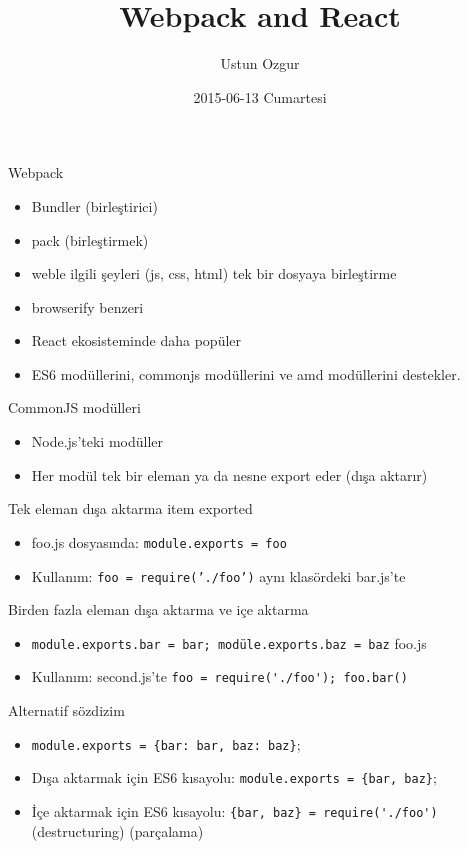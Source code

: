 \documentclass[presentation]{beamer}
\author{Ustun Ozgur}
\date{2015-06-13 Cumartesi}
\title{Webpack and React}
\begin{document}
\maketitle

\begin{frame}[label=sec-1]{Webpack}
\begin{itemize}
\item Bundler (birleştirici)
\item pack (birleştirmek)
\item weble ilgili şeyleri (js, css, html) tek bir dosyaya birleştirme
\item browserify benzeri
\item React ekosisteminde daha popüler
\item ES6 modüllerini, commonjs modüllerini ve amd modüllerini destekler.
\end{itemize}
\end{frame}

\begin{frame}[label=sec-2]{CommonJS modülleri}
\begin{itemize}
\item Node.js'teki modüller
\item Her modül tek bir eleman ya da nesne export eder (dışa aktarır)
\end{itemize}
\end{frame}

\begin{frame}[fragile,label=sec-3]{Tek eleman dışa aktarma item exported}
 \begin{itemize}
\item foo.js dosyasında: \verb~module.exports = foo~
\item Kullanım: \texttt{foo = require('./foo')} aynı klasördeki bar.js'te
\end{itemize}
\end{frame}

\begin{frame}[fragile,label=sec-4]{Birden fazla eleman dışa aktarma ve içe aktarma}
 \begin{itemize}
\item \verb~module.exports.bar = bar; modüle.exports.baz = baz~ foo.js
\item Kullanım: second.js'te \verb~foo = require('./foo'); foo.bar()~
\end{itemize}
\end{frame}

\begin{frame}[fragile,label=sec-5]{Alternatif sözdizim}
 \begin{itemize}
\item \verb~module.exports = {bar: bar, baz: baz}~;

\item Dışa aktarmak için ES6 kısayolu: \verb~module.exports = {bar, baz}~;

\item İçe aktarmak için ES6 kısayolu: \verb~{bar, baz} = require('./foo')~
  (destructuring) (parçalama)
\end{itemize}
\end{frame}
\end{document}
